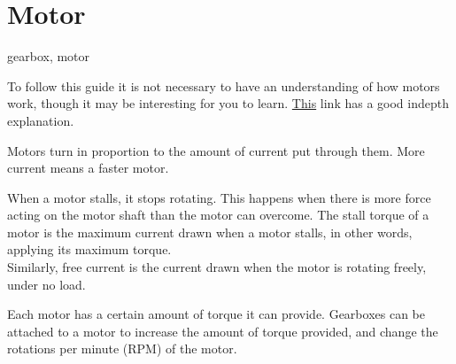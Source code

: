 \documentclass[../TinyBot.tex]{subfiles}
\begin{document}
    
\section{Motor} \label{sec:motor}
gearbox, motor

To follow this guide it is not necessary to have an understanding of how motors work, though it may be interesting for you to learn. \href{https://www.explainthatstuff.com/electricmotors.html}{This} link has a good indepth explanation.


Motors turn in proportion to the amount of current put through them. More current means a faster motor. 

When a motor stalls, it stops rotating. This happens when there is more force acting on the motor shaft than the motor can overcome. The stall torque of a motor is the maximum current drawn when a motor stalls, in other words, applying its maximum torque. \\


Similarly, free current is the current drawn when the motor is rotating freely, under no load. 

\bigskip


Each motor has a certain amount of torque it can provide. Gearboxes can be attached to a motor to increase the amount of torque provided, and change the rotations per minute (RPM) of the motor. 


\end{document}
